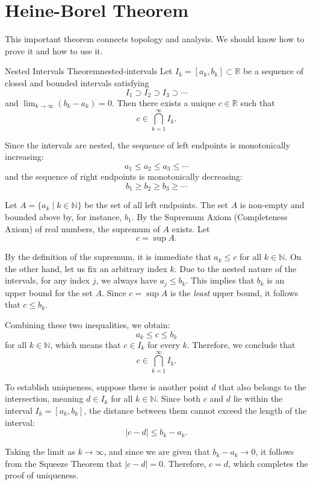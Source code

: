 \documentclass[UTF8,12pt,a4paper]{ctexart}
\makeatletter
\numberwithin{equation}{section}
\newcommand{\currentProofColor}{black}
\renewenvironment{proof}[1][Proof]{%
  \par
  \begingroup
  \edef\proofQEDColor{\currentProofColor}%
  \renewcommand{\qedsymbol}{\textcolor{\proofQEDColor}{$\blacksquare$}}%
  \pushQED{\qed}%
  \normalfont
  \topsep6\p@\@plus6\p@\relax
  \trivlist
  \item[\hskip\labelsep\bfseries\itshape #1\@addpunct{.}]\ignorespaces
}{%
  \popQED
  \endtrivlist
  \@endpefalse
  \endgroup
}
\makeatother
\begin{document}
\section{Heine-Borel Theorem}

This important theorem connects topology and analysis. We should know how to prove it and how to use it.

\begin{lem}{Nested Intervals Theorem}{nested-intervals}
Let $I_k = [a_k, b_k] \subset \mathbb{R}$ be a sequence of closed and bounded intervals satisfying
$$
I_1 \supset I_2 \supset I_3 \supset \cdots
$$
and $\lim_{k \to \infty} (b_k - a_k) = 0$. Then there exists a unique $c \in \mathbb{R}$ such that
$$
c \in \bigcap_{k=1}^\infty I_k.
$$
\end{lem}

\begin{proof}
Since the intervals are nested, the sequence of left endpoints is monotonically increasing:
$$
a_1 \le a_2 \le a_3 \le \cdots
$$
and the sequence of right endpoints is monotonically decreasing:
$$
b_1 \ge b_2 \ge b_3 \ge \cdots
$$

Let $A = \{a_k \mid k \in \mathbb{N}\}$ be the set of all left endpoints. The set $A$ is non-empty and bounded above by, for instance, $b_1$. By the Supremum Axiom (Completeness Axiom) of real numbers, the supremum of $A$ exists. Let
$$
c = \sup A.
$$

By the definition of the supremum, it is immediate that $a_k \le c$ for all $k \in \mathbb{N}$. On the other hand, let us fix an arbitrary index $k$. Due to the nested nature of the intervals, for any index $j$, we always have $a_j \le b_k$. This implies that $b_k$ is an upper bound for the set $A$. Since $c = \sup A$ is the \emph{least} upper bound, it follows that $c \le b_k$. 

Combining these two inequalities, we obtain:
$$
a_k \le c \le b_k
$$
for all $k \in \mathbb{N}$, which means that $c \in I_k$ for every $k$. Therefore, we conclude that
$$
c \in \bigcap_{k=1}^\infty I_k.
$$

\medskip

To establish uniqueness, suppose there is another point $d$ that also belongs to the intersection, meaning $d \in I_k$ for all $k \in \mathbb{N}$. Since both $c$ and $d$ lie within the interval $I_k = [a_k, b_k]$, the distance between them cannot exceed the length of the interval:
$$
|c - d| \le b_k - a_k.
$$

Taking the limit as $k \to \infty$, and since we are given that $b_k - a_k \to 0$, it follows from the Squeeze Theorem that $|c - d| = 0$. Therefore, $c = d$, which completes the proof of uniqueness.
\end{proof}
\end{document}
